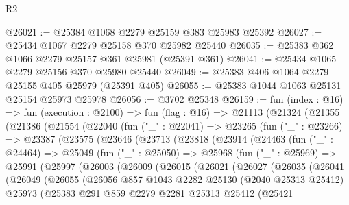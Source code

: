 \begin{lexlean}{R2}
\begin{coremodule}
@26021 := @25384 @1068 @2279 @25159 @383 @25983 @25392
@26027 := @25434 @1067 @2279 @25158 @370 @25982 @25440
@26035 := @25383 @362 @1066 @2279 @25157 @361 @25981 (@25391 @361)
@26041 := @25434 @1065 @2279 @25156 @370 @25980 @25440
@26049 := @25383 @406 @1064 @2279 @25155 @405 @25979 (@25391 @405)
@26055 := @25383 @1044 @1063 @25131 @25154 @25973 @25978
@26056 := @3702 @25348
@26159 := fun (index : @16) =>
  fun (execution : @2100) =>
  fun (flag : @16) =>
  @21113
    (@21324
      (@21355
        (@21386
          (@21554
            (@22040
              (fun ("_" : @22041) =>
              @23265
                (fun ("_" : @23266) =>
                @23387
                  (@23575
                    (@23646
                      (@23713
                        (@23818
                          (@23914
                            (@24463
                              (fun ("_" : @24464) =>
                              @25049
                                (fun ("_" : @25050) =>
                                @25968
                                  (fun ("_" : @25969) =>
                                  @25991
                                    (@25997
                                      (@26003
                                        (@26009
                                          (@26015
                                            (@26021
                                              (@26027
                                                (@26035
                                                  (@26041
                                                    (@26049
                                                      (@26055
                                                        (@26056
                                                          @857
                                                          @1043
                                                          @2282
                                                          @25130
                                                          (@2040 @25313 @25412)
                                                          @25973
                                                          (@25383
                                                            @291
                                                            @859
                                                            @2279
                                                            @2281
                                                            @25313
                                                            @25412
                                                            (@25421

\end{coremodule}
\end{lexlean}
